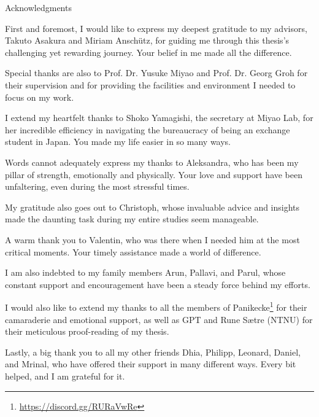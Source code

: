 \thispagestyle{empty}

\vspace*{20mm}

\begin{center}
    { Acknowledgments}
\end{center}

\vspace{10mm}

First and foremost, I would like to express my deepest gratitude to my advisors, Takuto Asakura and Miriam Anschütz, for guiding me through this thesis's challenging yet rewarding journey. Your belief in me made all the difference.

Special thanks are also to Prof. Dr. Yusuke Miyao and Prof. Dr. Georg Groh for their supervision and for providing the facilities and environment I needed to focus on my work.

I extend my heartfelt thanks to Shoko Yamagishi, the secretary at Miyao Lab, for her incredible efficiency in navigating the bureaucracy of being an exchange student in Japan. You made my life easier in so many ways.

Words cannot adequately express my thanks to Aleksandra, who has been my pillar of strength, emotionally and physically. Your love and support have been unfaltering, even during the most stressful times.

My gratitude also goes out to Christoph, whose invaluable advice and insights made the daunting task during my entire studies seem manageable.

A warm thank you to Valentin, who was there when I needed him at the most critical moments. Your timely assistance made a world of difference.

I am also indebted to my family members Arun, Pallavi, and Parul, whose constant support and encouragement have been a steady force behind my efforts.

I would also like to extend my thanks to all the members of Panikecke\footnote{\url{https://discord.gg/RURaVwRe}} for their camaraderie and emotional support, as well as GPT and Rune S{\ae}tre (NTNU) for their meticulous proof-reading of my thesis.

Lastly, a big thank you to all my other friends Dhia, Philipp, Leonard, Daniel, and Mrinal, who have offered their support in many different ways. Every bit helped, and I am grateful for it.

\cleardoublepage{}

